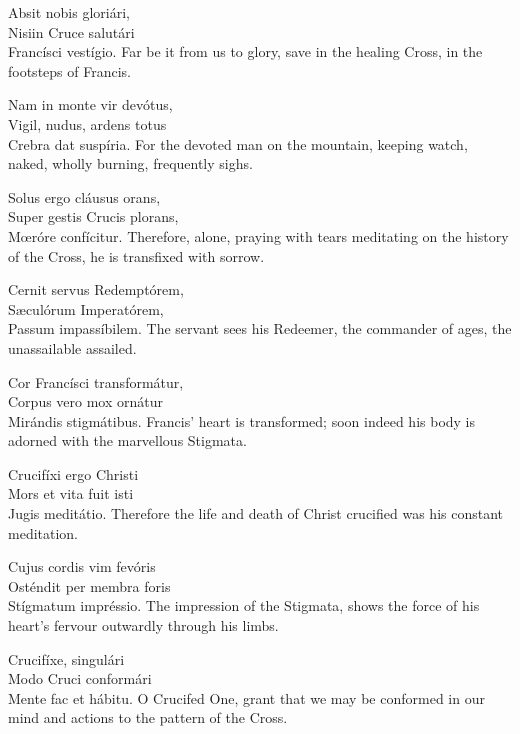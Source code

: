 
Absit nobis gloriári,\\
Nisi\lyrlink{}in Cruce salutári\\
Francísci vestígio.
\divverse
Far be it from us to glory, save in
the healing Cross, in the footsteps
of Francis.
\finishverse

\vskip3pt
Nam in monte vir devótus,\\
Vigil, nudus, ardens totus\\
Crebra dat suspíria.
\divverse
For the devoted man on the
mountain, keeping watch, naked,
wholly burning, frequently sighs.
\finishverse

\vskip3pt
Solus ergo cláusus orans,\\
Super gestis Crucis plorans,\\
Mœróre confícitur.
\divverse
Therefore, alone, praying with
tears meditating on the history
of the Cross, he is transfixed with
sorrow.
\finishverse

Cernit servus Redemptórem,\\
Sæculórum Imperatórem,\\
Passum impassíbilem.
\divverse
The servant sees his Redeemer,
the commander of ages, the
unassailable assailed.
\finishverse

Cor Francísci transformátur,\\
Corpus vero mox ornátur\\
Mirándis stigmátibus.
\divverse
Francis’ heart is transformed; soon
indeed his body is adorned with the
marvellous Stigmata.
\finishverse

Crucifíxi ergo Christi\\
Mors et vita fuit isti\\
Jugis meditátio.
\divverse
Therefore the life and death of
Christ crucified was his constant
meditation.
\finishverse

Cujus cordis vim fevóris\\
Osténdit per membra foris\\
Stígmatum impréssio.
\divverse
The impression of the Stigmata,
shows the force of his heart’s
fervour outwardly through his
limbs.
\finishverse

Crucifíxe, singulári\\
Modo Cruci conformári\\
Mente fac et hábitu.
\divverse
O Crucifed One, grant that we
may be conformed in our mind
and actions to the pattern of the
Cross.
\finishverse

